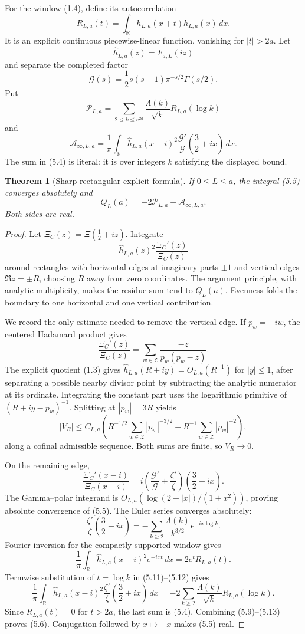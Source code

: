 \documentclass[11pt]{article}
\newtheorem{theorem}{Theorem}[section]
\newcommand{\R}{\mathbb R}
\newcommand{\cZ}{\mathcal Z}
\newcommand{\cG}{\mathcal G}
\newcommand{\cP}{\mathcal P}
\newcommand{\cA}{\mathcal A}
\begin{document}
For the window (1.4), define its autocorrelation
\[
 R_{L,a}(t)=\int_{\R}h_{L,a}(x+t)h_{L,a}(x)\,dx.
\tag{5.1}
\]
It is an explicit continuous piecewise-linear function, vanishing for \(|t|>2a\).
Let
\[
 \widehat h_{L,a}(z)=F_{a,L}(iz)
\tag{5.2}
\]
and separate the completed factor
\[
 \cG(s)=\frac12s(s-1)\pi^{-s/2}\Gamma(s/2).
\tag{5.3}
\]
Put
\[
 \cP_{L,a}=
 \sum_{2\le k\le e^{2a}}
 \frac{\Lambda(k)}{\sqrt{k}}R_{L,a}(\log k)
\tag{5.4}
\]
and
\[
 \cA_{\infty,L,a}=
 \frac1\pi\int_{\R}
 \widehat h_{L,a}(x-i)^2
 \frac{\cG'}{\cG}\!\left(\frac32+ix\right)\,dx.
\tag{5.5}
\]
The sum in (5.4) is literal: it is over integers \(k\) satisfying the displayed bound.

\begin{theorem}[Sharp rectangular explicit formula]\label{thm:explicit}
If \(0\le L\le a\), the integral (5.5) converges absolutely and
\[
 Q_L(a)=-2\cP_{L,a}+\cA_{\infty,L,a}.
\tag{5.6}
\]
Both sides are real.
\end{theorem}

\begin{proof}
Let \(\Xi_C(z)=\Xi(\frac12+iz)\).  Integrate
\[
 \widehat h_{L,a}(z)^2\frac{\Xi_C'(z)}{\Xi_C(z)}
\tag{5.7}
\]
around rectangles with horizontal edges at imaginary parts \(\pm1\) and vertical edges
\(\Re z=\pm R\), choosing \(R\) away from zero coordinates.  The argument principle, with
analytic multiplicity, makes the residue sum tend to \(Q_L(a)\).  Evenness folds the boundary to
one horizontal and one vertical contribution.

We record the only estimate needed to remove the vertical edge.  If \(p_w=-iw\), the centered
Hadamard product gives
\[
 \frac{\Xi_C'(z)}{\Xi_C(z)}
 =\sum_{w\in\cZ}\frac{-z}{p_w(p_w-z)}.
\tag{5.8}
\]
The explicit quotient (1.3) gives
\(\widehat h_{L,a}(R+iy)=O_{L,a}(R^{-1})\) for \(|y|\le1\), after separating a possible nearby
divisor point by subtracting the analytic numerator at its ordinate.  Integrating the constant
part uses the logarithmic primitive of \((R+iy-p_w)^{-1}\).  Splitting at
\(|p_w|=3R\) yields
\[
 |V_R|\le C_{L,a}\left(
 R^{-1/2}\sum_{w\in\cZ}|p_w|^{-3/2}
 +R^{-1}\sum_{w\in\cZ}|p_w|^{-2}\right),
\tag{5.9}
\]
along a cofinal admissible sequence.  Both sums are finite, so \(V_R\to0\).

On the remaining edge,
\[
 \frac{\Xi_C'(x-i)}{\Xi_C(x-i)}
 =i\left(\frac{\cG'}{\cG}+\frac{\zeta'}{\zeta}\right)
   \left(\frac32+ix\right).
\tag{5.10}
\]
The Gamma--polar integrand is
\(O_{L,a}(\log(2+|x|)/(1+x^2))\), proving absolute convergence of (5.5).
The Euler series converges absolutely:
\[
 \frac{\zeta'}{\zeta}\!\left(\frac32+ix\right)
 =-\sum_{k\ge2}\frac{\Lambda(k)}{k^{3/2}}e^{-ix\log k}.
\tag{5.11}
\]
Fourier inversion for the compactly supported window gives
\[
 \frac1\pi\int_{\R}
 \widehat h_{L,a}(x-i)^2e^{-ixt}\,dx
 =2e^tR_{L,a}(t).
\tag{5.12}
\]
Termwise substitution of \(t=\log k\) in (5.11)--(5.12) gives
\[
 \frac1\pi\int_{\R}\widehat h_{L,a}(x-i)^2
 \frac{\zeta'}{\zeta}\!\left(\frac32+ix\right)\,dx
 =-2\sum_{k\ge2}\frac{\Lambda(k)}{\sqrt{k}}R_{L,a}(\log k).
\tag{5.13}
\]
Since \(R_{L,a}(t)=0\) for \(t>2a\), the last sum is (5.4).  Combining
(5.9)--(5.13) proves (5.6).  Conjugation followed by \(x\mapsto-x\) makes (5.5) real.
\end{proof}
\end{document}
